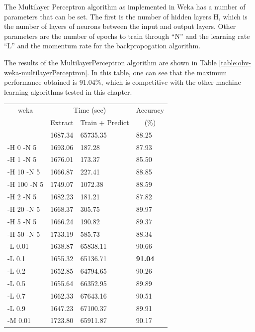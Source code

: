 The Multilayer Perceptron algorithm as implemented in Weka has a
number of parameters that can be set.  The first is the number of
hidden layers H, which is the number of layers of neurons between the
input and output layers.  Other parameters are the number of epochs to train
through ``N'' and the learning rate ``L'' and the momentum rate for
the backpropogation algorithm.

The results of the MultilayerPerceptron algorithm are shown in Table
\ref{table:obv-weka-multilayerPerceptron}. In this table, one can see
that the maximum performance obtained is 91.04\%, which is competitive
with the other machine learning algorithms tested in this chapter.

\begin{table}
\begin{tabular}{|l|l|l|l|}
\hline
\multicolumn{1}{|c|}{weka} & \multicolumn{2}{c|}{Time (sec)} & Accuracy \\
\hhline{|~|-|-|~|}
\multicolumn{1}{|c|}{param} & Extract & Train + Predict & \multicolumn{1}{c|}{(\%)} \\
\hhline{|=|=|=|=|}
              &  1687.34  &     65735.35  &  88.25  \\
 -H 0 -N 5    &  1693.06  &       187.28  &  87.93  \\
 -H 1 -N 5    &  1676.01  &       173.37  &  85.50  \\
 -H 10 -N 5   &  1666.87  &       227.41  &  88.85  \\
 -H 100 -N 5  &  1749.07  &      1072.38  &  88.59  \\
 -H 2 -N 5    &  1682.23  &       181.21  &  87.82  \\
 -H 20 -N 5   &  1668.37  &       305.75  &  89.97  \\
 -H 5 -N 5    &  1666.24  &       190.82  &  89.37  \\
 -H 50 -N 5   &  1733.19  &       585.73  &  88.34  \\
\hline
 -L 0.01      &  1638.87  &     65838.11  &  90.66  \\
 -L 0.1       &  1655.32  &     65136.71  &  \textbf{91.04}  \\
 -L 0.2       &  1652.85  &     64794.65  &  90.26  \\
 -L 0.5       &  1655.64  &     66352.95  &  89.89  \\
 -L 0.7       &  1662.33  &     67643.16  &  90.51  \\
 -L 0.9       &  1647.23  &     67100.37  &  89.91  \\
\hline
 -M 0.01      &  1723.80  &     65911.87  &  90.17  \\

\end{tabular}
\end{table}
